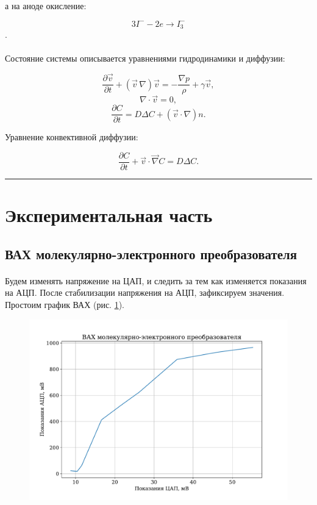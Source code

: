 \documentclass[a4paper,12pt]{article} %
\begin{document}
\noindent а на аноде окисление:

\[ 3I^- - 2e \rightarrow I_3^- \].

\paragraph{} Состояние системы описывается уравнениями гидродинамики и диффузии:

\[
\frac{\partial \vec{v}}{\partial t} + (\vec{v} \, \nabla)\vec{v} = - \frac{\nabla p}{\rho} + \gamma \vec{v},
\]
\[
\nabla \cdot \vec{v} = 0,
\]
\[
\frac{\partial C}{\partial t} = D \Delta C + (\vec{v} \cdot \nabla)n.
\]

Уравнение конвективной диффузии:

\[ \frac{\partial C}{\partial t} + \vec{v} \cdot \vec{\nabla} C = D \Delta C.
\]



\medskip\hrule\medskip

\section{Экспериментальная часть}

\subsection{ВАХ молекулярно-электронного преобразователя}

\paragraph{} Будем изменять напряжение на ЦАП, и следить за тем как изменяется показания на АЦП. После стабилизации напряжения на АЦП, зафиксируем значения. Простоим график ВАХ (рис. \ref{fig:vac}).

\begin{figure}[h]
\centering
\includegraphics[width=\textwidth]{vac.pdf}
\caption{}
\label{fig:vac}
\end{figure}
\end{document}
